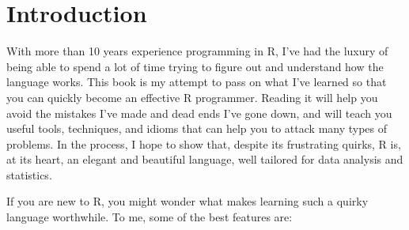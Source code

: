 \chapter{Introduction}

With more than 10 years experience programming in R, I've had the luxury
of being able to spend a lot of time trying to figure out and understand
how the language works. This book is my attempt to pass on what I've
learned so that you can quickly become an effective R programmer.
Reading it will help you avoid the mistakes I've made and dead ends I've
gone down, and will teach you useful tools, techniques, and idioms that
can help you to attack many types of problems. In the process, I hope to
show that, despite its frustrating quirks, R is, at its heart, an
elegant and beautiful language, well tailored for data analysis and
statistics.

If you are new to R, you might wonder what makes learning such a quirky
language worthwhile. To me, some of the best features are:

